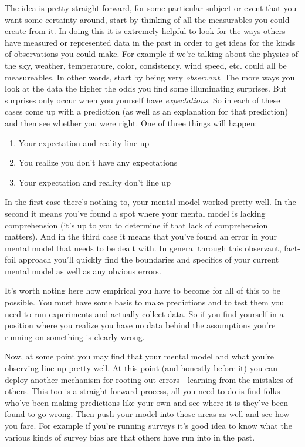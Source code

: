 \documentclass[11pt,a5paper]{book}
\begin{document}
The idea is pretty straight forward, for some particular subject or event that you want some certainty around, start by thinking of all the measurables you could create from it. In doing this it is extremely helpful to look for the ways others have measured or represented data in the past in order to get ideas for the kinds of observations you could make. For example if we're talking about the physics of the sky, weather, temperature, color, consistency, wind speed, etc. could all be measureables. In other words, start by being very \textit{observant}. The more ways you look at the data the higher the odds you find some illuminating surprises. But surprises only occur when you yourself have \textit{expectations}. So in each of these cases come up with a prediction (as well as an explanation for that prediction) and then see whether you were right. One of three things will happen:

\begin{enumerate}
\item Your expectation and reality line up
\item You realize you don't have any expectations
\item Your expectation and reality don't line up
\end{enumerate} 

In the first case there's nothing to, your mental model worked pretty well. In the second it means you've found a spot where your mental model is lacking comprehension (it's up to you to determine if that lack of comprehension matters). And in the third case it means that you've found an error in your mental model that needs to be dealt with. In general through this observant, fact-foil \cite{lipton} approach you'll quickly find the boundaries and specifics of your current mental model as well as any obvious errors.
\newline 

It's worth noting here how empirical you have to become for all of this to be possible. You must have some basis to make predictions and to test them you need to run experiments and actually collect data. So if you find yourself in a position where you realize you have no data behind the assumptions you're running on something is clearly wrong.
\newline

Now, at some point you may find that your mental model and what you're observing line up pretty well. At this point (and honestly before it) you can deploy another mechanism for rooting out errors - learning from the mistakes of others. This too is a straight forward process, all you need to do is find folks who've been making predictions like your own and see where it is they've been found to go wrong. Then push your model into those areas as well and see how you fare. For example if you're running surveys it's good idea to know what the various kinds of survey bias are that others have run into in the past.  
\newline
\end{document}
